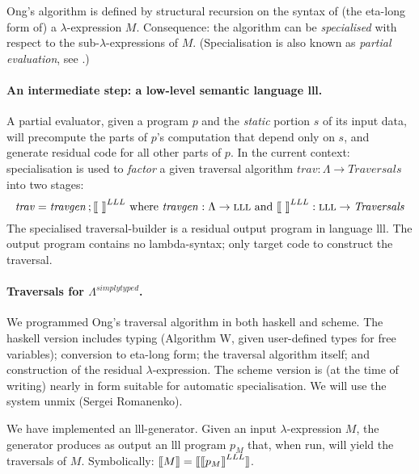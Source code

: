 \documentclass{article}
\begin{document}
Ong's  algorithm \cite{ong2015} is defined by structural recursion on the syntax of (the eta-long form of) a $\lambda$-expression $M$. 
Consequence: the  algorithm can be {\em specialised} with respect to the sub-$\lambda$-expressions of 
$M$. (Specialisation is also known as {\em partial evaluation}, see  \cite{JGS93}.)



\paragraph{An intermediate step: a low-level semantic language {\sc lll}.}



A partial evaluator, 
given a program $p$ and the {\em static} portion $s$ of its input data, will precompute the parts of $p$'s computation  that depend only on $s$, and generate residual code for all other parts of $p$. 
In the current context: specialisation is used to {\em factor} a given traversal algorithm
$ \mathit{trav} : \Lambda \to \mathit{Traversals}$ into two stages:
$$
 \mathit{trav} = \mathit{travgen}\, ; \mbox{$\lbrack\hspace{-0.3ex}\lbrack$}\ \mbox{$\rbrack\hspace{-0.3ex}\rbrack$}^{LLL}  
 \mbox{\ where\  }  
       \mathit{travgen}:\Lambda \to \mbox{\sc lll} 
 \mbox{\ and\ }
 \mbox{$\lbrack\hspace{-0.3ex}\lbrack$}\ \mbox{$\rbrack\hspace{-0.3ex}\rbrack$}^{LLL}  : \mbox{\sc lll} \to \mathit{Traversals}
$$
The specialised traversal-builder is a residual output program in language {\sc lll}. The output program  contains  no lambda-syntax; only target code to construct the traversal. 


\paragraph{Traversals for $\Lambda^{simplytyped}$.}
\hfill


We programmed Ong's  traversal algorithm  in both {\sc haskell} and {\sc scheme}. The {\sc haskell} version includes typing (Algorithm W, given user-defined types for free variables); conversion to eta-long form;  the traversal algorithm itself; and construction of the residual $\lambda$-expression.
The {\sc scheme} version is (at the time of writing) nearly in form suitable for automatic specialisation. We will use  the system {\sc unmix}  (Sergei Romanenko).

We have implemented an {\sc lll}-generator. Given an input $\lambda$-expression $M$, the generator produces as output an {\sc lll}  program $p_M$  that, when run, will yield the traversals of $M$. Symbolically:
$\mbox{$\lbrack\hspace{-0.3ex}\lbrack$} M\mbox{$\rbrack\hspace{-0.3ex}\rbrack$} = \mbox{$\lbrack\hspace{-0.3ex}\lbrack$} \mbox{$\lbrack\hspace{-0.3ex}\lbrack$} p_M\mbox{$\rbrack\hspace{-0.3ex}\rbrack$}^{LLL} \mbox{$\rbrack\hspace{-0.3ex}\rbrack$}$. 
\end{document}

